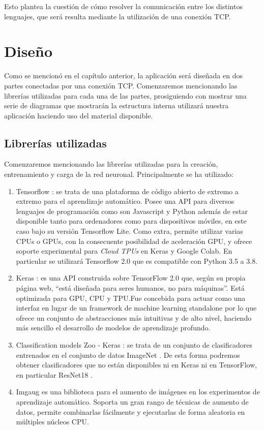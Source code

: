 Esto plantea la cuestión de cómo resolver la comunicación entre los distintos lenguajes, que será resulta mediante la utilización de una conexión TCP.\\
\chapter{Diseño}

Como se mencionó en el capítulo anterior, la aplicación será diseñada en dos partes conectadas por una conexión TCP. Comenzaremos mencionando las librerías utilizadas para cada una de las partes, prosiguiendo con mostrar una serie de diagramas que mostrarán la estructura interna utilizará nuestra aplicación haciendo uso del material disponible.

\section{Librerías utilizadas}

Comenzaremos mencionando las librerías utilizadas para la creación, entrenamiento y carga de la red neuronal. Principalmente se ha utilizado:
\begin{enumerate}
\item Tensorflow \cite{tensorflow2015-whitepaper}:  se trata de una plataforma de código abierto de extremo a extremo para el aprendizaje automático. Posee una API para diversos lenguajes de programación como son Javascript y Python además de estar disponible tanto para ordenadores como para dispositivos móviles, en este caso bajo su versión Tensorflow Lite. Como extra, permite utilizar varias CPUs o GPUs, con la consecuente posibilidad de aceleración GPU, y ofrece soporte experimental para \emph{Cloud TPUs} en Keras y Google Colab. En particular se utilizará Tensorflow 2.0 que es compatible con Python 3.5 a 3.8.
\item Keras \cite{chollet2015keras} : es una API construida sobre TensorFlow 2.0 que, según su propia página web, ``está diseñada para seres humanos, no para máquinas''. Está optimizada para GPU, CPU y TPU.Fue concebida para actuar como una interfaz en lugar de un framework de machine learning standalone por lo que ofrece un conjunto de abstracciones más intuitivas y de alto nivel, haciendo más sencillo el desarrollo de modelos de aprendizaje profundo.
\item Classification models Zoo - Keras \cite{classification_models}: se trata de un conjunto de clasificadores entrenados en el conjunto de datos ImageNet \cite{imagenet_cvpr09}. De esta forma podremos obtener clasificadores que no están disponibles ni en Keras ni en TensorFlow, en particular ResNet18 \cite{DBLP:journals/corr/HeZRS15}.
\item Imgaug \cite{imgaug} es una biblioteca para el aumento de imágenes en los experimentos de aprendizaje automático. Soporta un gran rango de técnicas de aumento de datos, permite combinarlas fácilmente y ejecutarlas de forma aleatoria en múltiples núcleos CPU.
\end{enumerate}

